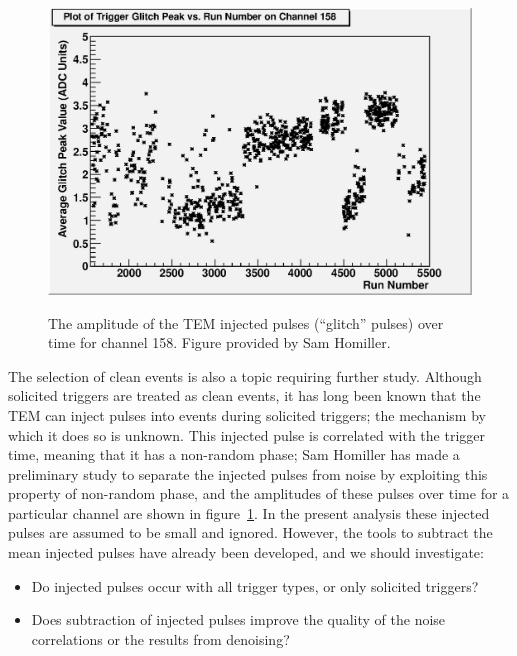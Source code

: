 \begin{figure}
\begin{center}
\includegraphics[keepaspectratio=true,width=\textwidth]{glitch_peak_vs_time_158.eps}
\end{center}
\renewcommand{\baselinestretch}{1}
\small\normalsize
\begin{quote}
\caption{The amplitude of the TEM injected pulses (``glitch'' pulses) over time for channel 158.  Figure provided by Sam Homiller.}
\label{fig:GlitchPeakAmplitudeVsTime}
\end{quote}
\end{figure}
\renewcommand{\baselinestretch}{2}
\small\normalsize

The selection of clean events is also a topic requiring further study.  Although solicited triggers are treated as clean events, it has long been known that the TEM can inject pulses into events during solicited triggers; the mechanism by which it does so is unknown.  This injected pulse is correlated with the trigger time, meaning that it has a non-random phase; Sam Homiller has made a preliminary study to separate the injected pulses from noise by exploiting this property of non-random phase, and the amplitudes of these pulses over time for a particular channel are shown in figure~\ref{fig:GlitchPeakAmplitudeVsTime}.  In the present analysis these injected pulses are assumed to be small and ignored.  However, the tools to subtract the mean injected pulses have already been developed, and we should investigate:
\begin{itemize}
\item Do injected pulses occur with all trigger types, or only solicited triggers?
\item Does subtraction of injected pulses improve the quality of the noise correlations or the results from denoising?
\end{itemize}

